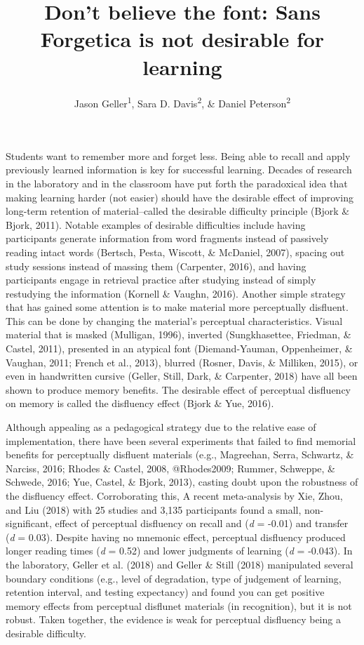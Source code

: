 \documentclass[english,doc]{apa6}
\author{Jason Geller\textsuperscript{1}, Sara D. Davis\textsuperscript{2}, \& Daniel Peterson\textsuperscript{2}}
\affiliation{
\vspace{0.5cm}
\textsuperscript{1} University of Iowa\\\textsuperscript{2} Skidmore College}
\title{Don't believe the font: Sans Forgetica is not desirable for learning}
\date{}
\begin{document}
\maketitle

Students want to remember more and forget less. Being able to recall and apply previously learned information is key for successful learning. Decades of research in the laboratory and in the classroom have put forth the paradoxical idea that making learning harder (not easier) should have the desirable effect of improving long-term retention of material--called the desirable difficulty principle (Bjork \& Bjork, 2011). Notable examples of desirable difficulties include having participants generate information from word fragments instead of passively reading intact words (Bertsch, Pesta, Wiscott, \& McDaniel, 2007), spacing out study sessions instead of massing them (Carpenter, 2016), and having participants engage in retrieval practice after studying instead of simply restudying the information (Kornell \& Vaughn, 2016). Another simple strategy that has gained some attention is to make material more perceptually disfluent. This can be done by changing the material's perceptual characteristics. Visual material that is masked (Mulligan, 1996), inverted (Sungkhasettee, Friedman, \& Castel, 2011), presented in an atypical font (Diemand-Yauman, Oppenheimer, \& Vaughan, 2011; French et al., 2013), blurred (Rosner, Davis, \& Milliken, 2015), or even in handwritten cursive (Geller, Still, Dark, \& Carpenter, 2018) have all been shown to produce memory benefits. The desirable effect of perceptual disfluency on memory is called the disfluency effect (Bjork \& Yue, 2016).

Although appealing as a pedagogical strategy due to the relative ease of implementation, there have been several experiments that failed to find memorial benefits for perceptually disfluent materials (e.g., Magreehan, Serra, Schwartz, \& Narciss, 2016; Rhodes \& Castel, 2008, @Rhodes2009; Rummer, Schweppe, \& Schwede, 2016; Yue, Castel, \& Bjork, 2013), casting doubt upon the robustness of the disfluency effect. Corroborating this, A recent meta-analysis by Xie, Zhou, and Liu (2018) with 25 studies and 3,135 participants found a small, non-significant, effect of perceptual disfluency on recall and (\emph{d} = -0.01) and transfer (\emph{d} = 0.03). Despite having no mnemonic effect, perceptual disfluency produced longer reading times (\emph{d} = 0.52) and lower judgments of learning (\emph{d} = -0.043). In the laboratory, Geller et al. (2018) and Geller \& Still (2018) manipulated several boundary conditions (e.g., level of degradation, type of judgement of learning, retention interval, and testing expectancy) and found you can get positive memory effects from perceptual disflunet materials (in recognition), but it is not robust. Taken together, the evidence is weak for perceptual disfluency being a desirable difficulty.
\end{document}
